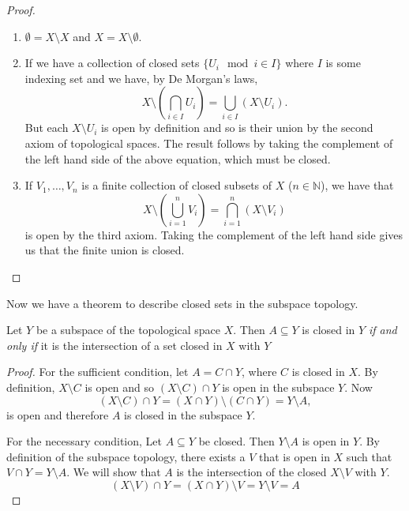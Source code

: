 \begin{proof}
  \begin{enumerate}
  \item $\emptyset = X \setminus X$ and $X = X \setminus \emptyset$.
  \item If we have a collection of closed sets $\{ U_i \mod i \in I
    \}$ where $I$ is some indexing set and we have, by De Morgan's
    laws,
    \[
      X \setminus \left( \bigcap_{i \in I}U_i \right) = \bigcup_{i \in I} (X
      \setminus U_i).
    \]
    But each $X \setminus U_i$ is open by definition and so is their
    union by the second axiom of topological spaces. The result
    follows by taking the complement of the left hand side of the
    above equation, which must be closed.
  \item If $V_1, \dots, V_n$ is a finite collection of closed subsets
    of $X$ ($n \in \mathbb{N}$), we have that
    \[
      X \setminus \left( \bigcup_{i=1}^n V_i \right) = \bigcap_{i =
        1}^n (X \setminus V_i)
    \]
    is open by the third axiom. Taking the complement of the left hand
    side gives us that the finite union is closed.
  \end{enumerate}
\end{proof}

Now we have a theorem to describe closed sets in the subspace
topology.

\begin{thm}
  \label{thm:closed-in-subspace}
  Let $Y$ be a subspace of the topological space $X$. Then $A
  \subseteq Y$ is closed in $Y$ \emph{if and only if} it is the
  intersection of a set closed in $X$ with $Y$
\end{thm}

\begin{proof}
  For the sufficient condition, let $A = C \cap Y$, where $C$ is
  closed in $X$. By definition, $X \setminus C$ is open and so $(X
  \setminus C) \cap Y$ is open in the subspace $Y$. Now
  \[
    (X \setminus C) \cap Y = (X \cap Y) \setminus (C \cap Y) = Y
    \setminus A,
  \]
  is open and therefore $A$ is closed in the subspace $Y$.

  For the necessary condition, Let $A \subseteq Y$ be closed. Then $Y
  \setminus A$ is open in $Y$. By definition of the subspace topology,
  there exists a $V$ that is open in $X$ such that $V \cap Y = Y
  \setminus A$. We will show that $A$ is the intersection of the
  closed $X \setminus V$ with $Y$.
  \[
    (X \setminus V) \cap Y = (X \cap Y) \setminus V = Y \setminus V = A
  \]
\end{proof}

